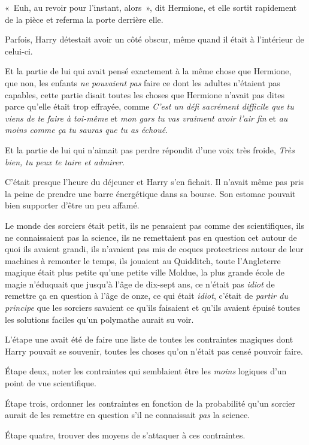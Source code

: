 «~Euh, au revoir pour l'instant, alors~», dit Hermione, et elle sortit rapidement de la pièce et referma la porte derrière elle.

Parfois, Harry détestait avoir un côté obscur, même quand il était à l'intérieur de celui-ci.

Et la partie de lui qui avait pensé exactement à la même chose que Hermione, que non, les enfants \emph{ne pouvaient pas} faire ce dont les adultes n'étaient pas capables, cette partie disait toutes les choses que Hermione n'avait pas dites parce qu'elle était trop effrayée, comme \emph{C'est un défi sacrément difficile que tu viens de te faire à toi-même} et \emph{mon gars tu vas vraiment avoir l'air fin} et \emph{au moins comme ça tu sauras que tu as échoué}.

Et la partie de lui qui n'aimait pas perdre répondit d'une voix très froide, \emph{Très bien, tu peux te taire et admirer}.

\later

C'était presque l'heure du déjeuner et Harry s'en fichait. Il n'avait même pas pris la peine de prendre une barre énergétique dans sa bourse. Son estomac pouvait bien supporter d'être un peu affamé.

Le monde des sorciers était petit, ils ne pensaient pas comme des scientifiques, ils ne connaissaient pas la science, ils ne remettaient pas en question cet autour de quoi ils avaient grandi, ils n'avaient pas mis de coques protectrices autour de leur machines à remonter le temps, ils jouaient au Quidditch, toute l'Angleterre magique était plus petite qu'une petite ville Moldue, la plus grande école de magie n'éduquait que jusqu'à l'âge de dix-sept ans, ce n'était pas \emph{idiot} de remettre ça en question à l'âge de onze, ce qui était \emph{idiot}, c'était de \emph{partir du principe} que les sorciers savaient ce qu'ils faisaient et qu'ils avaient épuisé toutes les solutions faciles qu'un polymathe aurait su voir.

L'étape une avait été de faire une liste de toutes les contraintes magiques dont Harry pouvait se souvenir, toutes les choses qu'on n'était pas censé pouvoir faire.

Étape deux, noter les contraintes qui semblaient être les \emph{moins} logiques d'un point de vue scientifique.

Étape trois, ordonner les contraintes en fonction de la probabilité qu'un sorcier aurait de les remettre en question s'il ne connaissait \emph{pas} la science.

Étape quatre, trouver des moyens de s'attaquer à ces contraintes.

